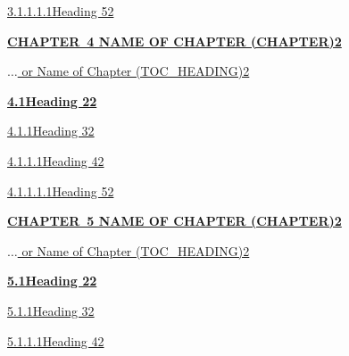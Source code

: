 \documentclass[12pt]{report}
\begin{document}
\begin{FlushLeft}
\href{}{3.1.1.1.1Heading 52}
\end{FlushLeft}\par

\begin{FlushLeft}
\textbf{\uppercase{\href{}{Chapter\ 4  Name of chapter (Chapter)2}}}
\end{FlushLeft}\par

\href{}{$ \ldots $ or Name of Chapter (TOC\_HEADING)2}\par

\begin{FlushLeft}
\textbf{\href{}{4.1Heading 22}}
\end{FlushLeft}\par

\begin{FlushLeft}
\href{}{4.1.1Heading 32}
\end{FlushLeft}\par

\begin{FlushLeft}
\href{}{4.1.1.1Heading 42}
\end{FlushLeft}\par

\begin{FlushLeft}
\href{}{4.1.1.1.1Heading 52}
\end{FlushLeft}\par

\begin{FlushLeft}
\textbf{\uppercase{\href{}{Chapter\ 5  Name of chapter (Chapter)2}}}
\end{FlushLeft}\par

\href{}{$ \ldots $ or Name of Chapter (TOC\_HEADING)2}\par

\begin{FlushLeft}
\textbf{\href{}{5.1Heading 22}}
\end{FlushLeft}\par

\begin{FlushLeft}
\href{}{5.1.1Heading 32}
\end{FlushLeft}\par

\begin{FlushLeft}
\href{}{5.1.1.1Heading 42}
\end{FlushLeft}\par
\end{document}
